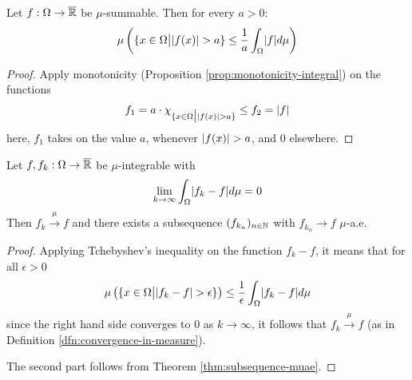 \begin{thm}\label{thm:tchebychev-inequality}
  Let $f: \Omega \to \overline{\mathbb{R}}$ be $\mu$-summable. Then for every $a > 0$:
  \begin{align*}
    \mu\left(
      \{x \in \Omega \big\vert \abs{f(x)} > a\}
      \leq \frac{1}{a} \int_{\Omega} \abs{f} d \mu
    \right)
  \end{align*}
\end{thm}
\begin{proof}
  Apply monotonicity (Proposition \ref{prop:monotonicity-integral}) on the functions
  \begin{align*}
      f_1 = a \cdot \chi_{\{x \in \Omega \big\vert \vert f(x)\vert > a\}} \leq f_2 = \vert f\vert
  \end{align*}
  here, $f_1$ takes on the value $a$, whenever $\vert f(x)\vert > a$, and $0$ elsewhere.
\end{proof}

\begin{cor}[]
Let $f, f_k: \Omega \to \overline{\mathbb{R}}$ be $\mu$-integrable with
\begin{align*}
  \lim_{k \to \infty} \int_{\Omega} \abs{f_k - f} d \mu = 0
\end{align*}
Then $f_k \stackrel{\mu}{\to} f$ and there exists a subsequence $(f_{k_n})_{n \in \mathbb{N}}$ with $f_{k_n} \to f$ $\mu$-a.e.
\end{cor}
\begin{proof}
Applying Tchebyshev's inequality on the function $f_k - f$, it means that for all $\epsilon > 0$
\begin{align*}
  \mu\left(
    \{x \in \Omega \big\vert \abs{f_k - f} > \epsilon\}
  \right)
    \leq \frac{1}{\epsilon} \int_{\Omega} \abs{f_k - f} d \mu
\end{align*}
since the right hand side converges to $0$ as $k \to  \infty$, it follows that $f_k \stackrel{\mu}{\to} f$ (as in Definition \ref{dfn:convergence-in-measure}).

The second part follows from Theorem \ref{thm:subsequence-muae}.
\end{proof}
